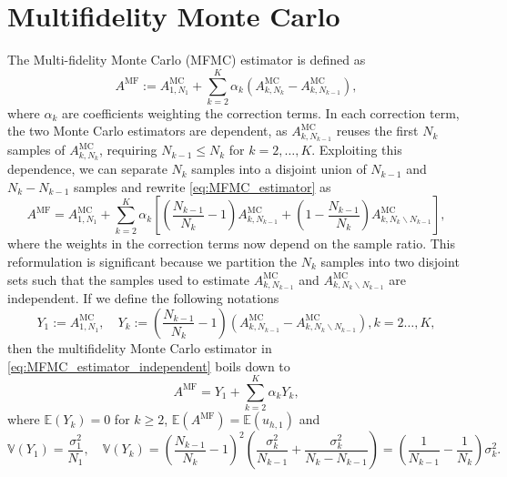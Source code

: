 \documentclass[final,3p,times,11pt]{elsarticle}
\begin{document}
\section{Multifidelity Monte Carlo}\label{sec:MFMC}
The Multi-fidelity Monte Carlo (MFMC) estimator is defined as
\begin{equation}\label{eq:MFMC_estimator}
    A^{\text{MF}} := A^{\text{MC}}_{1,N_1} + \sum_{k=2}^K \alpha_k\left(A^{\text{MC}}_{k,N_k} - A^{\text{MC}}_{k,N_{k-1}} \right),
\end{equation}
where $\alpha_k$ are coefficients weighting the correction terms. In each correction term, the two Monte Carlo estimators are dependent, as $A^{\text{MC}}_{k,N_{k-1}}$ reuses the first $N_{k}$ samples of $A^{\text{MC}}_{k,N_{k}}$, requiring $N_{k-1}\le N_k$ for $k=2,\ldots, K$. Exploiting this dependence, we can separate $N_k$ samples into a disjoint union of $N_{k-1}$ and $N_k - N_{k-1}$ samples and rewrite \eqref{eq:MFMC_estimator} as 
\begin{equation}\label{eq:MFMC_estimator_independent}
    A^{\text{MF}} = A^{\text{MC}}_{1,N_1} +  \sum_{k=2}^K \alpha_k\left[\left(\frac{N_{k-1}}{N_{k}}-1\right)A_{k,N_{k-1}}^{\text{MC}}+\left(1-\frac{N_{k-1}}{N_{k}}\right) A_{k,N_k\backslash N_{k-1}}^{\text{MC}}\right],
\end{equation}
where the weights in the correction terms now depend on the sample ratio. This reformulation is significant because we partition the  $N_k$ samples into two disjoint sets such that  the samples used to estimate $A_{k,N_{k-1}}^{\text{MC}}$ and $A_{k,N_k\backslash N_{k-1}}^{\text{MC}}$ are independent. If we define the following notations
\[
Y_1 :=A^{\text{MC}}_{1,N_1},\quad Y_k:=\left(\frac{N_{k-1}}{N_{k}}-1\right)\left(A_{k,N_{k-1}}^{\text{MC}}- A_{k,N_k\backslash N_{k-1}}^{\text{MC}}\right), k=2\ldots, K,
\]
then the multifidelity Monte Carlo estimator in \eqref{eq:MFMC_estimator_independent} boils down to 
\[
A^{\text{MF}} = Y_1 + \sum_{k=2}^K \alpha_k Y_k,
\]
where $\mathbb{E}(Y_k) = 0$ for $k\ge 2$, $\mathbb{E}(A^{\text{MF}}) = \mathbb{E}(u_{h,1}) $ and
\[
\mathbb{V}\left(Y_1\right) = \frac{\sigma_1^2}{N_1}, \quad \mathbb{V}\left(Y_k\right) = \left(\frac{N_{k-1}}{N_{k}}-1\right)^2\left(\frac{\sigma_k^2}{N_{k-1}}+\frac{\sigma_k^2}{N_k-N_{k-1}}\right) = \left(\frac{1}{N_{k-1}} - \frac{1}{N_k}\right)\sigma_k^2.
\]
\end{document}
